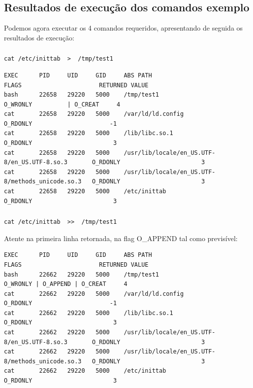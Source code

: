 \documentclass[a4paper]{article}
\begin{document}
\subsection{Resultados de execução dos comandos exemplo}
Podemos agora executar os 4 comandos requeridos, apresentando de seguida os resultados de execução:
\subsubsection{}

 \begin{lstlisting}[style=command]
 cat /etc/inittab  >  /tmp/test1
   \end{lstlisting}
   
\par 
\begin{lstlisting}[style=esc]
EXEC      PID     UID     GID     ABS PATH                                          FLAGS                      RETURNED VALUE
bash      22658   29220   5000    /tmp/test1                                         O_WRONLY          | O_CREAT     4
cat       22658   29220   5000    /var/ld/ld.config                                  O_RDONLY                      -1
cat       22658   29220   5000    /lib/libc.so.1                                     O_RDONLY                       3
cat       22658   29220   5000    /usr/lib/locale/en_US.UTF-8/en_US.UTF-8.so.3       O_RDONLY                       3
cat       22658   29220   5000    /usr/lib/locale/en_US.UTF-8/methods_unicode.so.3   O_RDONLY                       3
cat       22658   29220   5000    /etc/inittab                                       O_RDONLY                       3
 \end{lstlisting}

\subsubsection{}

 \begin{lstlisting}[style=command]
 cat /etc/inittab  >>  /tmp/test1
   \end{lstlisting}
   Atente na primeira linha retornada, na flag O\_APPEND tal como previsível:
\par 
\begin{lstlisting}[style=esc]
EXEC      PID     UID     GID     ABS PATH                                          FLAGS                      RETURNED VALUE
bash      22662   29220   5000    /tmp/test1                                         O_WRONLY | O_APPEND | O_CREAT     4
cat       22662   29220   5000    /var/ld/ld.config                                  O_RDONLY                      -1
cat       22662   29220   5000    /lib/libc.so.1                                     O_RDONLY                       3
cat       22662   29220   5000    /usr/lib/locale/en_US.UTF-8/en_US.UTF-8.so.3       O_RDONLY                       3
cat       22662   29220   5000    /usr/lib/locale/en_US.UTF-8/methods_unicode.so.3   O_RDONLY                       3
cat       22662   29220   5000    /etc/inittab                                       O_RDONLY                       3
 \end{lstlisting}
 
\end{document}
